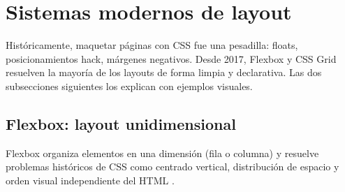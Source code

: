 \section{Sistemas modernos de layout}

Históricamente, maquetar páginas con CSS fue una pesadilla:
floats, posicionamientos hack, márgenes negativos. Desde 2017,
Flexbox y CSS Grid resuelven la mayoría de los layouts de forma
limpia y declarativa. Las dos subsecciones siguientes los explican
con ejemplos visuales.


\subsection{Flexbox: layout unidimensional}

Flexbox organiza elementos en una dimensión (fila o columna) y resuelve
problemas históricos de CSS como centrado vertical, distribución de
espacio y orden visual independiente del HTML \cite{robbins2018learning}.

